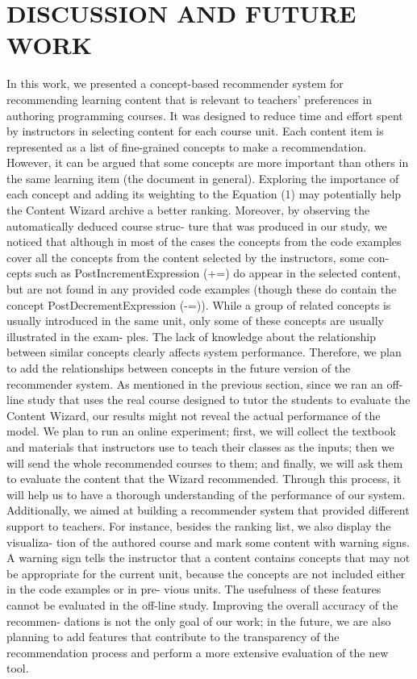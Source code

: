 \documentclass{sig-alternate}
\begin{document}
\section{DISCUSSION AND FUTURE WORK}
In this work, we presented a concept-based recommender system for recommending learning content that is relevant to teachers’
preferences in authoring programming courses. It was designed
to reduce time and effort spent by instructors in selecting content
for each course unit. Each content item is represented as a list
of fine-grained concepts to make a recommendation. However, it
can be argued that some concepts are more important than others
in the same learning item (the document in general). Exploring
the importance of each concept and adding its weighting to the
Equation (1) may potentially help the Content Wizard archive a
better ranking.
Moreover, by observing the automatically deduced course struc-
ture that was produced in our study, we noticed that although in
most of the cases the concepts from the code examples cover all the
concepts from the content selected by the instructors, some con-
cepts such as PostIncrementExpression (+=) do appear in the selected
content, but are not found in any provided code examples (though
these do contain the concept PostDecrementExpression (-=)). While
a group of related concepts is usually introduced in the same unit,
only some of these concepts are usually illustrated in the exam-
ples. The lack of knowledge about the relationship between similar
concepts clearly affects system performance. Therefore, we plan to
add the relationships between concepts in the future version of the
recommender system.
As mentioned in the previous section, since we ran an off-line
study that uses the real course designed to tutor the students to
evaluate the Content Wizard, our results might not reveal the actual
performance of the model. We plan to run an online experiment;
first, we will collect the textbook and materials that instructors use
to teach their classes as the inputs; then we will send the whole recommended courses to them; and finally, we will ask them to
evaluate the content that the Wizard recommended. Through this
process, it will help us to have a thorough understanding of the
performance of our system. Additionally, we aimed at building a
recommender system that provided different support to teachers.
For instance, besides the ranking list, we also display the visualiza-
tion of the authored course and mark some content with warning
signs. A warning sign tells the instructor that a content contains
concepts that may not be appropriate for the current unit, because
the concepts are not included either in the code examples or in pre-
vious units. The usefulness of these features cannot be evaluated in
the off-line study. Improving the overall accuracy of the recommen-
dations is not the only goal of our work; in the future, we are also
planning to add features that contribute to the transparency of the
recommendation process and perform a more extensive evaluation
of the new tool.
\end{document}
